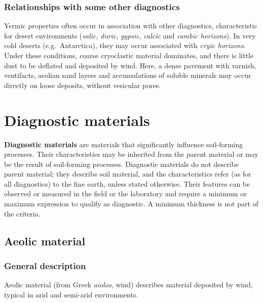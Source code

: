 \documentclass[
  letterpaper,
  DIV=11,
  numbers=noendperiod]{scrreprt}
\begin{document}
\hypertarget{relationships-with-some-other-diagnostics-51}{%
\subsubsection{Relationships with some other
diagnostics}\label{relationships-with-some-other-diagnostics-51}}

Yermic properties often occur in association with other diagnostics,
characteristic for desert environments (\emph{salic}, \emph{duric},
\emph{gypsic}, \emph{calcic} and \emph{cambic horizons}). In very cold
deserts (e.g.~Antarctica), they may occur associated with \emph{cryic
horizons}. Under these conditions, coarse cryoclastic material
dominates, and there is little dust to be deflated and deposited by
wind. Here, a dense pavement with varnish, ventifacts, aeolian sand
layers and accumulations of soluble minerals may occur directly on loose
deposits, without vesicular pores.

\hypertarget{diagnostic-materials}{%
\section{Diagnostic materials}\label{diagnostic-materials}}

\textbf{Diagnostic materials} are materials that significantly influence
soil-forming processes. Their characteristics may be inherited from the
parent material or may be the result of soil-forming processes.
Diagnostic materials do not describe parent material; they describe soil
material, and the characteristics refer (as for all diagnostics) to the
fine earth, unless stated otherwise. Their features can be observed or
measured in the field or the laboratory and require a minimum or maximum
expression to qualify as diagnostic. A minimum thickness is not part of
the criteria.

\hypertarget{aeolic-material}{%
\subsection{Aeolic material}\label{aeolic-material}}

\hypertarget{general-description-55}{%
\subsubsection{General description}\label{general-description-55}}

Aeolic material (from Greek \emph{aiolos}, wind) describes material
deposited by wind, typical in arid and semi-arid environments.
\end{document}
